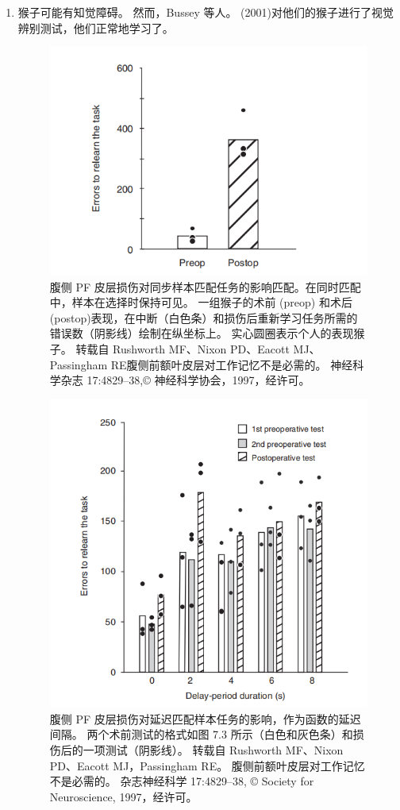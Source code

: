\begin{enumerate}
\item 猴子可能有知觉障碍。 
然而，Bussey 等人。 (2001)对他们的猴子进行了视觉辨别测试，他们正常地学习了。
\begin{figure}
	\centering
	\includegraphics[width=0.6\linewidth]{image_pfc/Fig_7_3}
	\caption{腹侧 PF 皮层损伤对同步样本匹配任务的影响匹配。在同时匹配中，样本在选择时保持可见。
		一组猴子的术前 (preop) 和术后 (postop)表现，在中断（白色条）和损伤后重新学习任务所需的错误数（阴影线）绘制在纵坐标上。 
		实心圆圈表示个人的表现猴子。 
	转载自 Rushworth MF、Nixon PD、Eacott MJ、Passingham RE腹侧前额叶皮层对工作记忆不是必需的。 神经科学杂志 17:4829–38,© 神经科学协会，1997，经许可。}
	\label{fig:fig}
\end{figure}
\begin{figure}
	\centering
	\includegraphics[width=0.6\linewidth]{image_pfc/Fig_7_4}
	\caption{腹侧 PF 皮层损伤对延迟匹配样本任务的影响，作为函数的延迟间隔。 
		两个术前测试的格式如图 7.3 所示（白色和灰色条）和损伤后的一项测试（阴影线）。 
		转载自 Rushworth MF、Nixon PD、Eacott MJ，Passingham RE。 
		腹侧前额叶皮层对工作记忆不是必需的。
		杂志神经科学 17:4829–38, © Society for Neuroscience, 1997，经许可。}
	\label{fig:fig}
\end{figure}

\end{enumerate}

